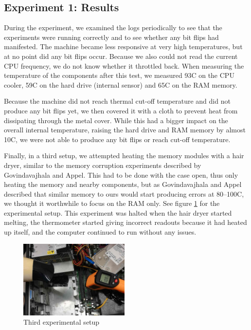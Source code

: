 \documentclass[conference]{IEEEtran}
\begin{document}
\subsection{Experiment 1: Results}

During the experiment, we examined the logs periodically to see that the
experiments were running correctly and to see whether any bit flips had
manifested. The machine became less responsive at very high temperatures, but
at no point did any bit flips occur. Because we also could not read the current
CPU frequency, we do not know whether it throttled back. When measuring the
temperature of the components after this test, we measured 93\degree{}C on the
CPU cooler, 59\degree{}C on the hard drive (internal sensor) and 65\degree{}C
on the RAM memory.

Because the machine did not reach thermal cut-off temperature and did not
produce any bit flips yet, we then covered it with a cloth to prevent heat from
dissipating through the metal cover. While this had a bigger impact on the
overall internal temperature, raising the hard drive and RAM memory by almost
10\degree{}C, we were not able to produce any bit flips or reach cut-off
temperature.

Finally, in a third setup, we attempted heating the memory modules with a hair
dryer, similar to the memory corruption experiments described by Govindavajhala
and Appel\cite{jvm}. This had to be done with the case open, thus only heating
the memory and nearby components, but as Govindavajhala and Appel described
that similar memory to ours would start producing errors at 80--100\degree{}C,
we thought it worthwhile to focus on the RAM only. See figure
\ref{fig:hairdryer} for the experimental setup. This experiment was halted when
the hair dryer started melting, the thermometer started giving incorrect
readouts because it had heated up itself, and the computer continued to run
without any issues.

\begin{figure}
	\centering
	\includegraphics[width=0.49\textwidth]{hairdryer.jpg}
	\caption{Third experimental setup}
	\label{fig:hairdryer}
\end{figure}
\end{document}
